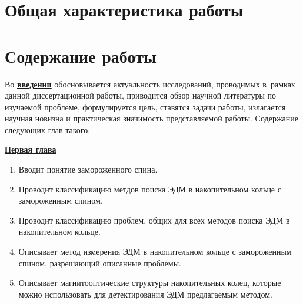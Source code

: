 
\newcommand{\geff}{\gamma_{eff}}

\section*{Общая характеристика работы}

\newcommand{\actuality}{\underline{\textbf{\actualityTXT}}}
\newcommand{\progress}{\underline{\textbf{\progressTXT}}}
\newcommand{\aim}{\underline{{\textbf\aimTXT}}}
\newcommand{\tasks}{\underline{\textbf{\tasksTXT}}}
\newcommand{\novelty}{\underline{\textbf{\noveltyTXT}}}
\newcommand{\influence}{\underline{\textbf{\influenceTXT}}}
\newcommand{\methods}{\underline{\textbf{\methodsTXT}}}
\newcommand{\defpositions}{\underline{\textbf{\defpositionsTXT}}}
\newcommand{\reliability}{\underline{\textbf{\reliabilityTXT}}}
\newcommand{\probation}{\underline{\textbf{\probationTXT}}}
\newcommand{\contribution}{\underline{\textbf{\contributionTXT}}}
\newcommand{\publications}{\underline{\textbf{\publicationsTXT}}}




\section*{Содержание работы}
Во \underline{\textbf{введении}} обосновывается актуальность
исследований, проводимых в~рамках данной диссертационной работы,
приводится обзор научной литературы по изучаемой проблеме,
формулируется цель, ставятся задачи работы, излагается научная новизна
и практическая значимость представляемой работы. Содержание следующих глав
такого:

\underline{\textbf{Первая глава}} \begin{enumerate}
	\item Вводит понятие замороженного спина.
	\item Проводит классификацию метдов поиска ЭДМ в накопительном кольце с замороженным спином.
	\item Проводит классификацию проблем, общих для всех методов поиска ЭДМ в накопительном кольце.
	\item Описывает метод измерения ЭДМ в накопительном кольце с замороженным спином, разрешающий описанные проблемы.
	\item Описывает магнитооптические структуры накопительных колец, которые можно использовать для детектирования ЭДМ предлагаемым методом.
\end{enumerate}

